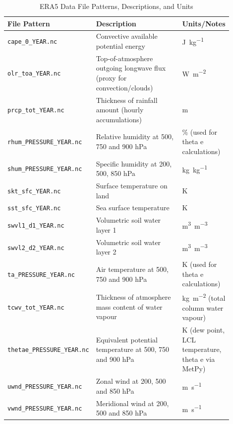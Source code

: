 \begin{table}[ht]
    \centering
    \caption{ERA5 Data File Patterns, Descriptions, and Units}
    \label{tab:era5-file-patterns}
    \begin{tabular}{p{0.25\linewidth} p{0.45\linewidth} p{0.2\linewidth}}
        \toprule
        File Pattern & Description & Units/Notes \\
        \midrule
        \texttt{cape\_0\_YEAR.nc} & Convective available potential energy & \unit{\joule\per\kilogram} \\
        \texttt{olr\_toa\_YEAR.nc} & Top-of-atmosphere outgoing longwave flux (proxy for convection/clouds) & \unit{\watt\per\meter\squared} \\
        \texttt{prcp\_tot\_YEAR.nc} & Thickness of rainfall amount (hourly accumulations) & \unit{\meter} \\
        \texttt{rhum\_PRESSURE\_YEAR.nc} & Relative humidity at 500, 750 and 900 \unit{\hecto\pascal} & \unit{\percent} (used for theta e calculations) \\
        \texttt{shum\_PRESSURE\_YEAR.nc} & Specific humidity at 200, 500, 850 \unit{\hecto\pascal} & \unit{\kilogram\per\kilogram} \\
        \texttt{skt\_sfc\_YEAR.nc} & Surface temperature on land & \unit{\kelvin} \\
        \texttt{sst\_sfc\_YEAR.nc} & Sea surface temperature & \unit{\kelvin} \\
        \texttt{swvl1\_d1\_YEAR.nc} & Volumetric soil water layer 1 & \unit{\meter\cubed\per\meter\cubed} \\
        \texttt{swvl2\_d2\_YEAR.nc} & Volumetric soil water layer 2 & \unit{\meter\cubed\per\meter\cubed} \\
        \texttt{ta\_PRESSURE\_YEAR.nc} & Air temperature at 500, 750 and 900 \unit{\hecto\pascal} & \unit{\kelvin} (used for theta e calculations) \\
        \texttt{tcwv\_tot\_YEAR.nc} & Thickness of atmosphere mass content of water vapour & \unit{\kilogram\per\meter\squared} (total column water vapour) \\
        \texttt{thetae\_PRESSURE\_YEAR.nc} & Equivalent potential temperature at 500, 750 and 900 \unit{\hecto\pascal} & \unit{\kelvin} (dew point, LCL temperature, theta e via MetPy) \\
        \texttt{uwnd\_PRESSURE\_YEAR.nc} & Zonal wind at 200, 500 and 850 \unit{\hecto\pascal} & \unit{\meter\per\second} \\
        \texttt{vwnd\_PRESSURE\_YEAR.nc} & Meridional wind at 200, 500 and 850 \unit{\hecto\pascal} & \unit{\meter\per\second} \\
        \bottomrule
    \end{tabular}
\end{table}


